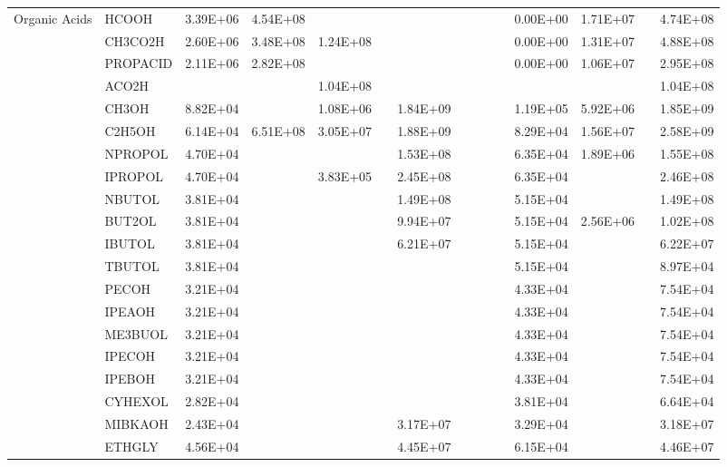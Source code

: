 \begin{longtable}{lllllllllllllll}
	\hline \multirow{4}{*}{Organic Acids} & HCOOH & 3.39E+06 & 4.54E+08 &  &  &  &  &  &  &  & 0.00E+00 & 1.71E+07 &  & 4.74E+08 \\
	 & CH3CO2H & 2.60E+06 & 3.48E+08 & 1.24E+08 &  &  &  &  &  &  & 0.00E+00 & 1.31E+07 &  & 4.88E+08 \\
	 & PROPACID & 2.11E+06 & 2.82E+08 &  &  &  &  &  &  &  & 0.00E+00 & 1.06E+07 &  & 2.95E+08 \\
	 & ACO2H &  &  & 1.04E+08 &  &  &  &  &  &  &  &  &  & 1.04E+08 \\
	\hline \parbox[t]{2mm}{} & CH3OH & 8.82E+04 &  & 1.08E+06 &  & 1.84E+09 &  &  &  &  & 1.19E+05 & 5.92E+06 &  & 1.85E+09 \\*
	 & C2H5OH & 6.14E+04 & 6.51E+08 & 3.05E+07 &  & 1.88E+09 &  &  &  &  & 8.29E+04 & 1.56E+07 &  & 2.58E+09 \\*
	 & NPROPOL & 4.70E+04 &  &  &  & 1.53E+08 &  &  &  &  & 6.35E+04 & 1.89E+06 &  & 1.55E+08 \\*
	 & IPROPOL & 4.70E+04 &  & 3.83E+05 &  & 2.45E+08 &  &  &  &  & 6.35E+04 &  &  & 2.46E+08 \\*
	 & NBUTOL & 3.81E+04 &  &  &  & 1.49E+08 &  &  &  &  & 5.15E+04 &  &  & 1.49E+08 \\
	 & BUT2OL & 3.81E+04 &  &  &  & 9.94E+07 &  &  &  &  & 5.15E+04 & 2.56E+06 &  & 1.02E+08 \\
	 & IBUTOL & 3.81E+04 &  &  &  & 6.21E+07 &  &  &  &  & 5.15E+04 &  &  & 6.22E+07 \\
	 & TBUTOL & 3.81E+04 &  &  &  &  &  &  &  &  & 5.15E+04 &  &  & 8.97E+04 \\
	 & PECOH & 3.21E+04 &  &  &  &  &  &  &  &  & 4.33E+04 &  &  & 7.54E+04 \\
	 & IPEAOH & 3.21E+04 &  &  &  &  &  &  &  &  & 4.33E+04 &  &  & 7.54E+04 \\
	 & ME3BUOL & 3.21E+04 &  &  &  &  &  &  &  &  & 4.33E+04 &  &  & 7.54E+04 \\
	 & IPECOH & 3.21E+04 &  &  &  &  &  &  &  &  & 4.33E+04 &  &  & 7.54E+04 \\
	 & IPEBOH & 3.21E+04 &  &  &  &  &  &  &  &  & 4.33E+04 &  &  & 7.54E+04 \\
	 & CYHEXOL & 2.82E+04 &  &  &  &  &  &  &  &  & 3.81E+04 &  &  & 6.64E+04 \\
	 & MIBKAOH & 2.43E+04 &  &  &  & 3.17E+07 &  &  &  &  & 3.29E+04 &  &  & 3.18E+07 \\
	 & ETHGLY & 4.56E+04 &  &  &  & 4.45E+07 &  &  &  &  & 6.15E+04 &  &  & 4.46E+07 \\

\end{longtable}
